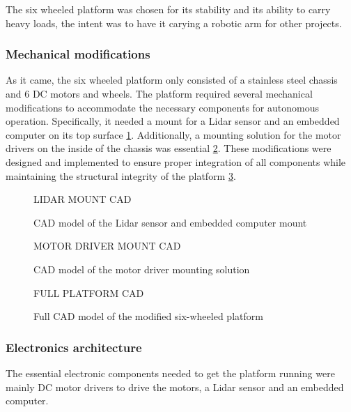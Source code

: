 \documentclass[11pt]{article}
\begin{document}
            The six wheeled platform was chosen for its stability and its ability to carry heavy loads, the intent was to have it carying a robotic arm for other projects.

            \subsubsection{Mechanical modifications}
            As it came, the six wheeled platform only consisted of a stainless steel chassis and 6 DC motors and wheels. The platform required several mechanical modifications to accommodate the necessary components for autonomous operation. Specifically, it needed a mount for a Lidar sensor and an embedded computer on its top surface \ref{fig:lidar_mount}. Additionally, a mounting solution for the motor drivers on the inside of the chassis was essential \ref{fig:motor_driver_mount}. These modifications were designed and implemented to ensure proper integration of all components while maintaining the structural integrity of the platform \ref{fig:full_cad_model}.

            \begin{figure}[htbp]
                \centering
                LIDAR MOUNT CAD
                \caption{CAD model of the Lidar sensor and embedded computer mount}
                \label{fig:lidar_mount}
            \end{figure}
            
            \begin{figure}[htbp]
                \centering
                MOTOR DRIVER MOUNT CAD
                \caption{CAD model of the motor driver mounting solution}
                \label{fig:motor_driver_mount}
            \end{figure}
            
            \begin{figure}[htbp]
                \centering
                FULL PLATFORM CAD
                \caption{Full CAD model of the modified six-wheeled platform}
                \label{fig:full_cad_model}
            \end{figure}

            \subsubsection{Electronics architecture}
                The essential electronic components needed to get the platform running were mainly DC motor drivers to drive the motors, a Lidar sensor and an embedded computer.
                
\end{document}
